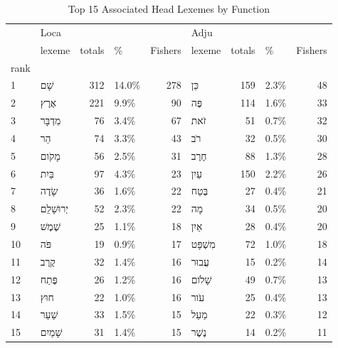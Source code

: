 \begin{table}[htbp!]
\centering
\caption{Top 15 Associated Head Lexemes by Function}
\label{table:la_lexs}
\begin{tabular}{llrlrlrlr}
\toprule
{} & \multicolumn{4}{l}{Loca} & \multicolumn{4}{l}{Adju} \\
{} &                     lexeme & totals &      \% & Fishers &                  lexeme & totals &     \% & Fishers \\
rank &                            &        &        &         &                         &        &       &         \\
\midrule
1    &          \texthebrew{שָׁם} &    312 &  14.0\% &     278 &       \texthebrew{כֵּן} &    159 &  2.3\% &      48 \\
2    &         \texthebrew{אֶרֶץ} &    221 &   9.9\% &      90 &       \texthebrew{פֶּה} &    114 &  1.6\% &      33 \\
3    &      \texthebrew{מִדְבָּר} &     76 &   3.4\% &      67 &       \texthebrew{זֹאת} &     51 &  0.7\% &      32 \\
4    &           \texthebrew{הַר} &     74 &   3.3\% &      43 &        \texthebrew{רֹב} &     32 &  0.5\% &      30 \\
5    &        \texthebrew{מָקֹום} &     56 &   2.5\% &      31 &      \texthebrew{חֶרֶב} &     88 &  1.3\% &      28 \\
6    &        \texthebrew{בַּיִת} &     97 &   4.3\% &      23 &      \texthebrew{עַיִן} &    150 &  2.2\% &      26 \\
7    &        \texthebrew{שָׂדֶה} &     36 &   1.6\% &      22 &     \texthebrew{בֶּטַח} &     27 &  0.4\% &      21 \\
8    &  \texthebrew{יְרוּשָׁלִַם} &     52 &   2.3\% &      22 &        \texthebrew{מָה} &     34 &  0.5\% &      20 \\
9    &       \texthebrew{שֶׁמֶשׁ} &     25 &   1.1\% &      18 &      \texthebrew{אַיִן} &     28 &  0.4\% &      20 \\
10   &          \texthebrew{פֹּה} &     19 &   0.9\% &      17 &  \texthebrew{מִשְׁפָּט} &     72 &  1.0\% &      18 \\
11   &         \texthebrew{קֶרֶב} &     32 &   1.4\% &      16 &     \texthebrew{עֲבוּר} &     15 &  0.2\% &      14 \\
12   &        \texthebrew{פֶּתַח} &     26 &   1.2\% &      16 &    \texthebrew{שָׁלֹום} &     49 &  0.7\% &      13 \\
13   &          \texthebrew{חוּץ} &     22 &   1.0\% &      16 &       \texthebrew{עֹור} &     25 &  0.4\% &      13 \\
14   &        \texthebrew{שַׁעַר} &     33 &   1.5\% &      15 &      \texthebrew{מַעַל} &     22 &  0.3\% &      12 \\
15   &      \texthebrew{שָׁמַיִם} &     31 &   1.4\% &      15 &     \texthebrew{נֶשֶׁר} &     14 &  0.2\% &      11 \\
\bottomrule
\end{tabular}
\end{table}
